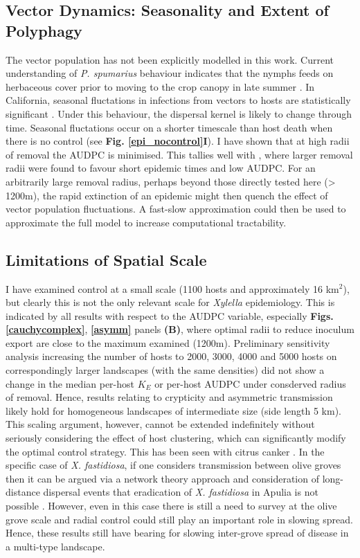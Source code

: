 \documentclass[11pt,letterpaper]{article}
\begin{document}
\subsection*{Vector Dynamics: Seasonality and Extent of Polyphagy}

The vector population has not been explicitly modelled in this work. Current understanding of \emph{P. spumarius} behaviour indicates that the nymphs feeds on herbaceous cover prior to moving to the crop canopy in late summer \cite{GimenezRomero2023}. In California, seasonal fluctations in infections from vectors to hosts are statistically significant \cite{Bodino2021b}. Under this behaviour, the dispersal kernel is likely to change through time. Seasonal fluctations occur on a shorter timescale than host death when there is no control (see \textbf{Fig. \ref{epi_nocontrol}I}). I have shown that at high radii of removal the AUDPC is minimised. This tallies well with \cite{Cunniffe2015}, where larger removal radii were found to favour short epidemic times and low AUDPC. For an arbitrarily large removal radius, perhaps beyond those directly tested here (> 1200m), the rapid extinction of an epidemic might then quench the effect of vector population fluctuations. A fast-slow approximation could then be used to approximate the full model to increase computational tractability.

\subsection*{Limitations of Spatial Scale}

I have examined control at a small scale (1100 hosts and approximately 16 km$^2$), but clearly this is not the only relevant scale for \emph{Xylella} epidemiology. This is indicated by all results with respect to the AUDPC variable, especially \textbf{Figs. \ref{cauchycomplex}}, \textbf{\ref{asymm}} panels \textbf{(B)}, where optimal radii to reduce inoculum export are close to the maximum examined (1200m). Preliminary sensitivity analysis increasing the number of hosts to 2000, 3000, 4000 and 5000 hosts on correspondingly larger landscapes (with the same densities) did not show a change in the median per-host $K_E$ or per-host AUDPC under consderved radius of removal. Hence, results relating to crypticity and asymmetric transmission likely hold for homogeneous landscapes of intermediate size (side length 5 km). This scaling argument, however, cannot be extended indefinitely without seriously considering the effect of host clustering, which can significantly modify the optimal control strategy. This has been seen with citrus canker \cite{Parnell2010}. In the specific case of \emph{X. fastidiosa}, if one considers transmission between olive groves then it can be argued via a network theory approach and consideration of long-distance dispersal events that eradication of \emph{X. fastidiosa} in Apulia is not possible \cite{Strona2017, Strona2020}. However, even in this case there is still a need to survey at the olive grove scale and radial control could still play an important role in slowing spread. Hence, these results still have bearing for slowing inter-grove spread of disease in a multi-type landscape.
\end{document}
